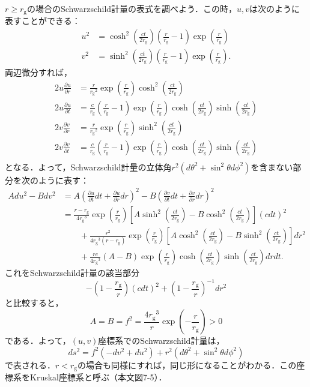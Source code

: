 \documentclass[a4paper]{ltjsreport}
\begin{document}
$r\geq{}r_\text{g}$の場合のSchwarzschild計量の表式を調べよう．この時，$u,v$は次のように表すことができる：
\begin{align*}
  u^2 &= \cosh^2\left(\frac{ct}{2r_\text{g}}\right)\left(\frac{r}{r_\text{g}} - 1\right)\exp\left(\frac{r}{r_\text{g}}\right)\\
  v^2 &= \sinh^2\left(\frac{ct}{2r_\text{g}}\right)\left(\frac{r}{r_\text{g}} - 1\right)\exp\left(\frac{r}{r_\text{g}}\right).
\end{align*}
両辺微分すれば，
\begin{align*}
  2u\frac{\partial{u}}{\partial{r}} &= \frac{r}{{r_\text{g}}^2}\exp\left(\frac{r}{r_\text{g}}\right)\cosh^2\left(\frac{ct}{2r_\text{g}}\right)\\
  2u\frac{\partial{u}}{\partial{t}} &= \frac{c}{r_\text{g}}\left(\frac{r}{r_\text{g}} - 1\right)\exp\left(\frac{r}{r_\text{g}}\right)\cosh\left(\frac{ct}{2r_\text{g}}\right)\sinh\left(\frac{ct}{2r_\text{g}}\right)\\
  2v\frac{\partial{v}}{\partial{r}} &= \frac{r}{{r_\text{g}}^2}\exp\left(\frac{r}{r_\text{g}}\right)\sinh^2\left(\frac{ct}{2r_\text{g}}\right)\\
  2v\frac{\partial{v}}{\partial{t}} &= \frac{c}{r_\text{g}}\left(\frac{r}{r_\text{g}} - 1\right)\exp\left(\frac{r}{r_\text{g}}\right)\cosh\left(\frac{ct}{2r_\text{g}}\right)\sinh\left(\frac{ct}{2r_\text{g}}\right)\\
\end{align*}
となる．よって，Schwarzschild計量の立体角$r^2(d\theta^2 + \sin^2\theta{d\phi^2})$を含まない部分を次のように表す：
\begin{align*}
  Adu^2 - Bdv^2 &= A\left(\frac{\partial{u}}{\partial{t}}dt + \frac{\partial{u}}{\partial{r}}dr\right)^2 - B\left(\frac{\partial{v}}{\partial{t}}dt + \frac{\partial{v}}{\partial{r}}dr\right)^2\\
  &= \frac{r - r_\text{g}}{4{r_\text{g}}^3}\exp\left(\frac{r}{r_\text{g}}\right)\left[A\sinh^2\left(\frac{ct}{2r_\text{g}}\right) - B\cosh^2\left(\frac{ct}{2r_\text{g}}\right)\right](cdt)^2\\
  &\qquad + \frac{r^2}{4{r_\text{g}}^3(r - r_\text{g})}\exp\left(\frac{r}{r_\text{g}}\right)\left[A\cosh^2\left(\frac{ct}{2r_\text{g}}\right) - B\sinh^2\left(\frac{ct}{2r_\text{g}}\right)\right]dr^2\\
  &\qquad + \frac{rc}{4{r_\text{g}}^3}(A - B)\exp\left(\frac{r}{r_\text{g}}\right)\cosh\left(\frac{ct}{2r_\text{g}}\right)\sinh\left(\frac{ct}{2r_\text{g}}\right)drdt.
\end{align*}
これをSchwarzschild計量の該当部分
\[ - \left(1 - \frac{r_\text{g}}{r}\right)(cdt)^2 + \left(1 - \frac{r_\text{g}}{r}\right)^{ - 1}dr^2\]
と比較すると，
\[A=B=f^2=\frac{4{r_\text{g}}^3}{r}\exp\left( - \frac{r}{r_\text{g}}\right)>0\]
である．よって，$(u,v)$座標系でのSchwarzschild計量は，
\[ds^2=f^2( - dv^2 + du^2) + r^2(d\theta^2 + \sin^2\theta{d\phi^2})\]
で表される．$r<{r_\text{g}}$の場合も同様にすれば，同じ形になることがわかる．この座標系をKruskal座標系と呼ぶ（本文図7-5）．
\end{document}
